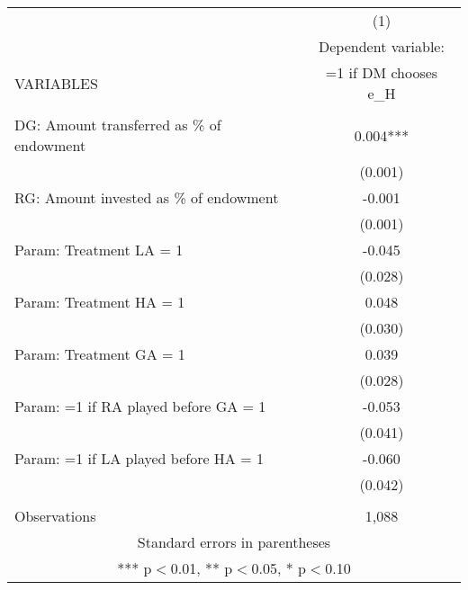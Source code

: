 \documentclass[]{article}
\begin{document}
\begin{tabular}{lc} \hline
 & (1) \\
 & Dependent variable: \\
VARIABLES & =1 if DM chooses e\_H \\ \hline
 &  \\
DG: Amount transferred as \% of endowment & 0.004*** \\
 & (0.001) \\
RG: Amount invested as \% of endowment & -0.001 \\
 & (0.001) \\
Param: Treatment LA = 1 & -0.045 \\
 & (0.028) \\
Param: Treatment HA = 1 & 0.048 \\
 & (0.030) \\
Param: Treatment GA = 1 & 0.039 \\
 & (0.028) \\
Param: =1 if RA played before GA = 1 & -0.053 \\
 & (0.041) \\
Param: =1 if LA played before HA = 1 & -0.060 \\
 & (0.042) \\
 &  \\
 Observations & 1,088 \\ \hline
\multicolumn{2}{c}{ Standard errors in parentheses} \\
\multicolumn{2}{c}{ *** p$<$0.01, ** p$<$0.05, * p$<$0.10} \\
\end{tabular}
\end{document}
